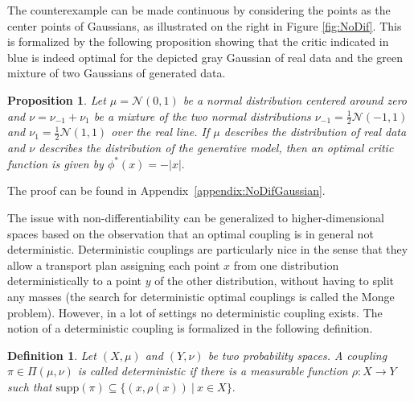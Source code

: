 \documentclass{article} %
\newcommand{\Li}[1]{\mathcal{L}ip_{#1}}
\newcommand{\supp}[1]{\text{supp}({#1})}
\newcommand{\Gauss}{\text{Gauss}}
\newtheorem{definition}{Definition}
\newtheorem{proposition}{Proposition}
\begin{document}
The counterexample can be made continuous by considering the points as the center points of Gaussians, as illustrated on the right in Figure \ref{fig:NoDif}. This is formalized by the following proposition showing that the critic indicated in blue is indeed optimal for the depicted gray Gaussian of real data and the green mixture of two Gaussians of generated data. 



\begin{proposition}\label{prp:Gaussians}
Let $\mu=\mathcal{N}(0,1)$ be a normal distribution centered around zero and $\nu=\nu_{-1}+\nu_{1}$ be a mixture of the two normal distributions $\nu_{-1}=\frac{1}{2}\mathcal{N}(-1,1)$  and $\nu_{1}=\frac{1}{2}\mathcal{N}(1,1)$ over the real line.
%
If $\mu$ describes the distribution of real data and $\nu$ describes 
the distribution of the generative model,
then an optimal critic function is given by $\phi^*(x)=-|x|.$
\end{proposition}

The proof can be found in Appendix~\ref{appendix:NoDifGaussian}.

The issue with non-differentiability can be generalized to higher-dimensional spaces based on the observation that an optimal coupling is in general not deterministic. Deterministic couplings are particularly nice in the sense that they allow a transport plan assigning each point $x$ from one distribution deterministically to a point $y$ of the other distribution, without having to split any masses
(the search for deterministic optimal couplings is called the Monge problem). However, in a lot of settings no deterministic coupling exists.
The notion of a deterministic coupling is formalized in the following definition.
%
\begin{definition}
Let $(X,\mu)$ and $(Y,\nu)$ be two probability spaces. A coupling $\pi\in \Pi(\mu,\nu)$ is called deterministic if there is a measurable function $\rho:X\rightarrow Y$ such that $\supp{\pi}\subseteq\{(x,\rho(x))\ |\ x\in X\}.$
\end{definition}
\end{document}
